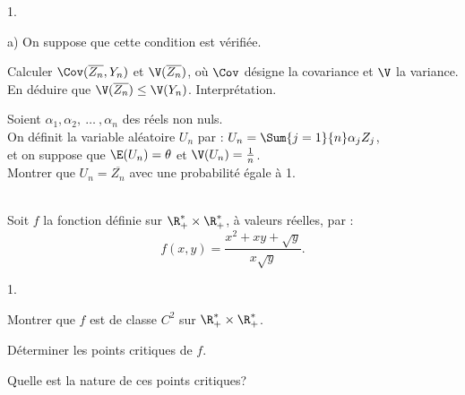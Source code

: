 \documentclass[11pt]{article}%
\begin{document}
\begin{exerciceAP}
\begin{noliste}{1.}
\begin{noliste}{a)}
      On suppose que cette condition est vérifiée. \\
    \item Calculer $\Cov ( \overline{Z_n} , Y_n )$ et $\V(
      \overline{Z_n} )$, où $\Cov$ désigne la covariance et $\V$ la
      variance. \\
      En déduire que $\V (\overline{Z_n} ) \leq
      \V(Y_n)$. Interprétation.
    \end{noliste}
  \item Soient $\alpha_1, \alpha_2,\ \dots\ , \alpha_n$ des réels non
    nuls.\\
    On définit la variable aléatoire $U_n$ par : $U_n = \Sum{j=1}{n}
    \alpha_j Z_j$,\\
    et on suppose que $\E(U_n) = \theta$ et $\V(U_n) = \frac{1}{n}$. \\
    Montrer que $U_n = \overline{Z_n}$ avec une probabilité égale à 1. 
  \end{noliste}
\end{exerciceAP}


\begin{exerciceSP}~\\
  Soit $f$ la fonction définie sur $\R_+^* \times \R_+^*$, à valeurs
  réelles, par :
  \[
  f(x,y) = \frac{x^2 + xy + \sqrt{y} }{x \sqrt{y} }. 
  \]
  \begin{noliste}{1.}
    \setlength{\itemsep}{2mm}
  \item Montrer que $f$ est de classe $C^2$ sur $\R_+^* \times \R_+^*$.
  \item Déterminer les points critiques de $f$. 
  \item Quelle est la nature de ces points critiques?
  \end{noliste}
\end{exerciceSP}

\end{document}
